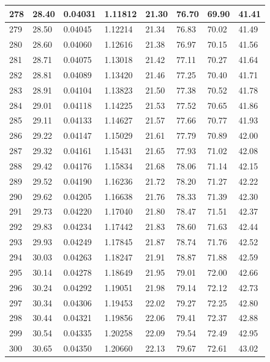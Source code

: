 \documentclass[12pt,a4paper,twoside]{article}
\begin{document}
\begin{center}
\begin{longtable}{l l l l | l l l l}
278 & 28.40 & 0.04031 & 1.11812 & 21.30 & 76.70 & 69.90 & 41.41 \\ \hline
279 & 28.50 & 0.04045 & 1.12214 & 21.34 & 76.83 & 70.02 & 41.49 \\ \hline
280 & 28.60 & 0.04060 & 1.12616 & 21.38 & 76.97 & 70.15 & 41.56 \\ \hline
281 & 28.71 & 0.04075 & 1.13018 & 21.42 & 77.11 & 70.27 & 41.64 \\ \hline
282 & 28.81 & 0.04089 & 1.13420 & 21.46 & 77.25 & 70.40 & 41.71 \\ \hline
283 & 28.91 & 0.04104 & 1.13823 & 21.50 & 77.38 & 70.52 & 41.78 \\ \hline
284 & 29.01 & 0.04118 & 1.14225 & 21.53 & 77.52 & 70.65 & 41.86 \\ \hline
285 & 29.11 & 0.04133 & 1.14627 & 21.57 & 77.66 & 70.77 & 41.93 \\ \hline
286 & 29.22 & 0.04147 & 1.15029 & 21.61 & 77.79 & 70.89 & 42.00 \\ \hline
287 & 29.32 & 0.04161 & 1.15431 & 21.65 & 77.93 & 71.02 & 42.08 \\ \hline
288 & 29.42 & 0.04176 & 1.15834 & 21.68 & 78.06 & 71.14 & 42.15 \\ \hline
289 & 29.52 & 0.04190 & 1.16236 & 21.72 & 78.20 & 71.27 & 42.22 \\ \hline
290 & 29.62 & 0.04205 & 1.16638 & 21.76 & 78.33 & 71.39 & 42.30 \\ \hline
291 & 29.73 & 0.04220 & 1.17040 & 21.80 & 78.47 & 71.51 & 42.37 \\ \hline
292 & 29.83 & 0.04234 & 1.17442 & 21.83 & 78.60 & 71.63 & 42.44 \\ \hline
293 & 29.93 & 0.04249 & 1.17845 & 21.87 & 78.74 & 71.76 & 42.52 \\ \hline
294 & 30.03 & 0.04263 & 1.18247 & 21.91 & 78.87 & 71.88 & 42.59 \\ \hline
295 & 30.14 & 0.04278 & 1.18649 & 21.95 & 79.01 & 72.00 & 42.66 \\ \hline
296 & 30.24 & 0.04292 & 1.19051 & 21.98 & 79.14 & 72.12 & 42.73 \\ \hline
297 & 30.34 & 0.04306 & 1.19453 & 22.02 & 79.27 & 72.25 & 42.80 \\ \hline
298 & 30.44 & 0.04321 & 1.19856 & 22.06 & 79.41 & 72.37 & 42.88 \\ \hline
299 & 30.54 & 0.04335 & 1.20258 & 22.09 & 79.54 & 72.49 & 42.95 \\ \hline
300 & 30.65 & 0.04350 & 1.20660 & 22.13 & 79.67 & 72.61 & 43.02 \\ \hline

\end{longtable}
\end{center}
\end{document}
